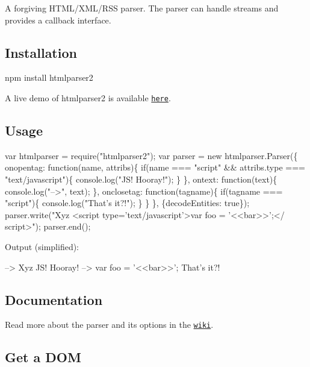 \href{https://npmjs.org/package/htmlparser2}{\tt } \href{https://npmjs.org/package/htmlparser2}{\tt } \href{http://travis-ci.org/fb55/htmlparser2}{\tt } \href{https://coveralls.io/r/fb55/htmlparser2}{\tt }

A forgiving H\+T\+M\+L/\+X\+M\+L/\+R\+SS parser. The parser can handle streams and provides a callback interface.

\subsection*{Installation}

npm install htmlparser2

A live demo of htmlparser2 is available \href{https://astexplorer.net/#/2AmVrGuGVJ}{\tt here}.

\subsection*{Usage}


\begin{DoxyCode}
var htmlparser = require("htmlparser2");
var parser = new htmlparser.Parser(\{
  onopentag: function(name, attribs)\{
    if(name === "script" && attribs.type === "text/javascript")\{
      console.log("JS! Hooray!");
    \}
  \},
  ontext: function(text)\{
    console.log("-->", text);
  \},
  onclosetag: function(tagname)\{
    if(tagname === "script")\{
      console.log("That's it?!");
    \}
  \}
\}, \{decodeEntities: true\});
parser.write("Xyz <script type='text/javascript'>var foo = '<<bar>>';</ script>");
parser.end();
\end{DoxyCode}


Output (simplified)\+:


\begin{DoxyCode}
--> Xyz
JS! Hooray!
--> var foo = '<<bar>>';
That's it?!
\end{DoxyCode}


\subsection*{Documentation}

Read more about the parser and its options in the \href{https://github.com/fb55/htmlparser2/wiki/Parser-options}{\tt wiki}.

\subsection*{Get a D\+OM}

